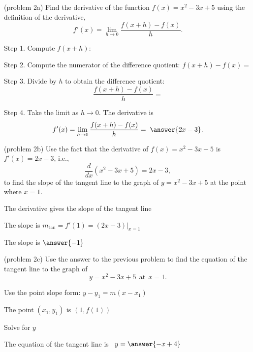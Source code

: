 \documentclass[handout]{ximera}
\begin{document}
\begin{problem}(problem 2a)
Find the derivative of the function $f(x) = x^2 - 3x + 5$ using the definition of the derivative,
\[
f'(x) = \lim_{h \to 0} \frac{f(x+h) - f(x)}{h}.
\]

Step 1. Compute $f(x + h)$:
\begin{multipleChoice}
\end{multipleChoice}


Step 2. Compute the numerator of the difference quotient: $f(x+h) - f(x) =$
\begin{multipleChoice}
\end{multipleChoice}


Step 3. Divide by $h$ to obtain the difference quotient:
\[
\frac{f(x+h) - f(x)}{h} = 
\]
\begin{multipleChoice}
\end{multipleChoice}

Step 4. Take the limit as $h \to 0$. The derivative is
\[
f'(x) = \lim_{h \to 0} \frac{f(x+h) - f(x)}{h} = \; \answer{2x-3}.
\]
\end{problem} 


\begin{problem}(problem 2b)
Use the fact that the derivative of $f(x) = x^2 -3x + 5$ is $f'(x) = 2x-3$,
i.e., 
\[
\frac{d}{dx}\left( x^2 - 3x + 5 \right) = 2x-3,
\]
to find the slope of the tangent line to the graph of 
$y = x^2 - 3x + 5$ at the point where $x = 1$.\\
\begin{hint}
The derivative gives the slope of the tangent line
\end{hint}
\begin{hint}
The slope is $m_{\text{tan}} = f'(1) = (2x-3)\big|_{x=1}$
\end{hint}
The slope is $\answer{-1}$
\end{problem}

\begin{problem}(problem 2c)
Use the answer to the previous problem to find the equation of the tangent line to the graph of 
\[
y = x^2 - 3x + 5 \ \ \text{at} \ \ x=1.
\]
\begin{hint}
Use the point slope form: $y-y_1 = m(x-x_1)$
\end{hint}
\begin{hint}
The point $(x_1,y_1)$ is $(1, f(1))$
\end{hint}
\begin{hint}
Solve for $y$
\end{hint}
The equation of the tangent line is \ $y = \answer{-x+4}$
\end{problem}
\end{document}
